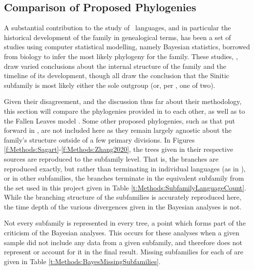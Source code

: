 \subsection{Comparison of Proposed Phylogenies}\label{ss:Methods:Bayesian}

A substantial contribution to the study of \lfam\ languages, and in particular the historical development of the family in genealogical terms, has been a set of studies using computer statistical modelling, namely Bayesian statistics, borrowed from biology to infer the most likely phylogeny for the family. These studies, , draw varied conclusions about the internal structure of the family and the timeline of its development, though all draw the conclusion that the Sinitic subfamily is most likely either the sole outgroup (or, per , one of two).

Given their disagreement, and the discussion thus far about their methodology, this section will compare the phylogenies provided in  to each other, as well as to the Fallen Leaves model \cite{VanDriem2014}. Some other proposed phylogenies, such as that put forward in , are not included here as they remain largely agnostic about the family's structure outside of a few primary divisions. In Figures \ref{f:Methods:Sagart}-\ref{f:Methods:Zhang2020}, the trees given in their respective sources are reproduced to the subfamily level. That is, the branches are reproduced exactly, but rather than terminating in individual languages (as in ), or in other subfamilies, the branches terminate in the equivalent subfamily from the set used in this project given in Table \ref{t:Methods:SubfamilyLanguageCount}. While the branching structure of the subfamilies is accurately reproduced here, the time depth of the various divergences given in the Bayesian analyses is not.

Not every subfamily is represented in every tree, a point which forms part of the criticism of the Bayesian analyses. This occurs for these analyses when a given sample did not include any data from a given subfamily, and therefore does not represent or account for it in the final result. Missing subfamilies for each of  are given in Table \ref{t:Methods:BayesMissingSubfamilies}.

